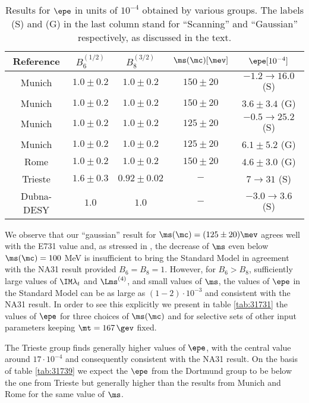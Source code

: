 \begin{table}[thb]
\caption[]{ Results for $\epe$ in units of $10^{-4}$ obtained
by various groups. The labels (S) and (G) in the last column
stand for ``Scanning'' and ``Gaussian'' respectively, as discussed
in the text. 
\label{tab:31738}}
\begin{center}
\begin{tabular}{|c|c|c|c||c|}\hline
  {\bf Reference}& $B^{(1/2)}_6$& $B^{(3/2)}_8$ & $\ms(\mc)[\mev]$ &
 $\epe[10^{-4}]$ \\ \hline
Munich
\cite{BJL96a}& $1.0\pm 0.2$ &$1.0\pm0.2$ & $150\pm20$ & $-1.2\to 16.0$ (S) \\
Munich
\cite{BJL96a}& $1.0\pm 0.2$ &$1.0\pm0.2$ & $150\pm20$ & $3.6\pm 3.4$ (G) \\
Munich
\cite{BJL96b}& $1.0\pm 0.2$ &$1.0\pm0.2$ & $125\pm20$ & $-0.5\to 25.2$ (S) \\
Munich
\cite{BJL96b}& $1.0\pm 0.2$ &$1.0\pm0.2$ & $125\pm20$ & $6.1\pm 5.2$ (G) \\
\hline
Rome
\cite{ciuchini:96}& $1.0\pm 0.2$ &$1.0\pm0.2$ & $150\pm20$ & 
$4.6\pm 3.0$ (G) \\
\hline
Trieste
\cite{BERT98}& $1.6\pm 0.3$ &$0.92\pm0.02$ & $-$ & 
$7\to 31$ (S) \\
\hline
Dubna-DESY
\cite{BELKOV} 
& $1.0$ &$1.0$ & $-$ & $-3.0 \to 3.6$ (S) \\
\hline
\end{tabular}
\end{center}
\end{table}

We observe that our ``gaussian'' result for $\ms(\mc)=(125\pm20)\mev$
agrees well with the E731
value and,
as stressed in \cite{BJL96a}, the decrease of $\ms$
 even below $\ms(\mc)= 100$ MeV is insufficient to bring 
the Standard Model in agreement with
the NA31 result provided $B_6=B_8=1.$
However, for $B_6>B_8$, sufficiently large values of
$\IM\lambda_t$ and $\Lms^{(4)}$, and small values of $\ms$, the values
of $\epe$ in the Standard Model can be as large as $(1-2)\cdot 10^{-3}$
and consistent with the NA31 result.
In order to see this explicitly we present in table \ref{tab:31731} the
values of $\epe$ for three choices of $\ms(\mc)$ and for selective
sets of other input parameters keeping  $\mt=167\,\gev$
fixed. 

The Trieste group finds generally higher values of
$\epe$, with the central value around $17\cdot 10^{-4}$ and consequently
consistent with the NA31 result. On the basis of table \ref{tab:31739}
we expect the $\epe$ from the Dortmund group to be below the one from
Trieste but generally higher than the results from Munich and Rome
for the same value of $\ms$.  

